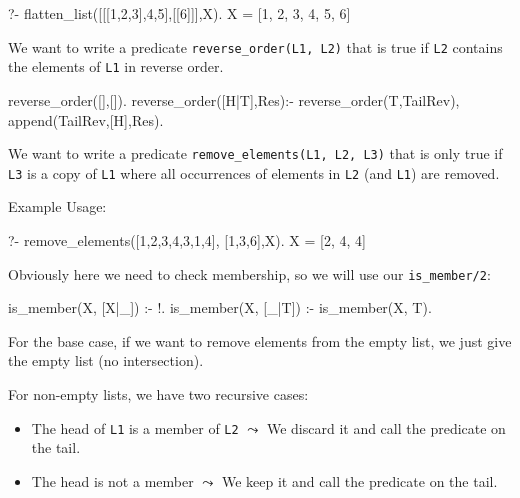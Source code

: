 \begin{codeblock}
?- flatten_list([[[1,2,3],4,5],[[6]]],X).
X = [1, 2, 3, 4, 5, 6]
\end{codeblock}



We want to write a predicate \texttt{reverse\_order(L1, L2)} that is true if \texttt{L2} contains the elements of \texttt{L1} in reverse order.

\begin{codeblock}
reverse_order([],[]).
reverse_order([H|T],Res):-
    reverse_order(T,TailRev),
    append(TailRev,[H],Res).
\end{codeblock}



We want to write a predicate \texttt{remove\_elements(L1, L2, L3)} that is only true if \texttt{L3} is a copy of \texttt{L1} where all occurrences of elements in \texttt{L2} (and \texttt{L1}) are removed.

Example Usage:
\begin{codeblock}
?- remove_elements([1,2,3,4,3,1,4], [1,3,6],X).
X = [2, 4, 4]
\end{codeblock}

Obviously here we need to check membership, so we will use our \texttt{is\_member/2}:

\begin{codeblock}
is_member(X, [X|_]) :- !.             %
is_member(X, [_|T]) :- is_member(X, T).
\end{codeblock}

For the base case, if we want to remove elements from the empty list, we just give the empty list (no intersection). 

For non-empty lists, we have two recursive cases:
\begin{itemize}
    \item The head of \texttt{L1} is a member of \texttt{L2} $\leadsto$ We discard it and call the predicate on the tail.
    \item The head is not a member $\leadsto$ We keep it and call the predicate on the tail. 
\end{itemize}

